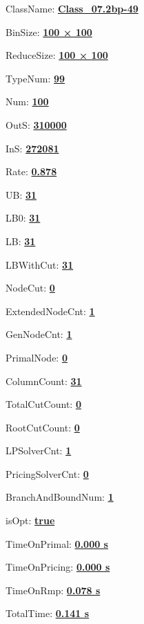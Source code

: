 \documentclass[11pt]{article}
\begin{document}
\pagestyle{empty}


ClassName: \underline{\textbf{Class_07.2bp-49}}
\par
BinSize: \underline{\textbf{100 × 100}}
\par
ReduceSize: \underline{\textbf{100 × 100}}
\par
TypeNum: \underline{\textbf{99}}
\par
Num: \underline{\textbf{100}}
\par
OutS: \underline{\textbf{310000}}
\par
InS: \underline{\textbf{272081}}
\par
Rate: \underline{\textbf{0.878}}
\par
UB: \underline{\textbf{31}}
\par
LB0: \underline{\textbf{31}}
\par
LB: \underline{\textbf{31}}
\par
LBWithCut: \underline{\textbf{31}}
\par
NodeCut: \underline{\textbf{0}}
\par
ExtendedNodeCnt: \underline{\textbf{1}}
\par
GenNodeCnt: \underline{\textbf{1}}
\par
PrimalNode: \underline{\textbf{0}}
\par
ColumnCount: \underline{\textbf{31}}
\par
TotalCutCount: \underline{\textbf{0}}
\par
RootCutCount: \underline{\textbf{0}}
\par
LPSolverCnt: \underline{\textbf{1}}
\par
PricingSolverCnt: \underline{\textbf{0}}
\par
BranchAndBoundNum: \underline{\textbf{1}}
\par
isOpt: \underline{\textbf{true}}
\par
TimeOnPrimal: \underline{\textbf{0.000 s}}
\par
TimeOnPricing: \underline{\textbf{0.000 s}}
\par
TimeOnRmp: \underline{\textbf{0.078 s}}
\par
TotalTime: \underline{\textbf{0.141 s}}
\par
\newpage


\end{document}
